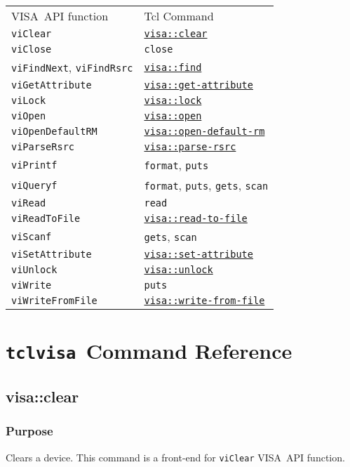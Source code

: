 \documentclass[12pt, a4paper]{report}
\newcommand{\tclvisa}{{\tt tclvisa }}
\newcommand{\VISA}{\mbox{VISA }}
\newcommand{\COMMANDREF}[1]{{\tt \hyperref[#1]{#1}}}
\newcommand{\VISACOMMANDREF}[1]{{\tt \mbox{#1}}\index{#1}}
\newcommand{\TCLCOMMANDREF}[1]{{\tt \mbox{#1}}\index{#1}}
\newcommand{\PURPOSE}{\subsection*{Purpose}}
\newcommand{\COMMAND}[1]{\section{#1}\label{#1}}
\begin{document}
\begin{tabular}{ll}
\VISA API function & Tcl Command \\
\VISACOMMANDREF{viClear} & \COMMANDREF{visa::clear}	\\
\VISACOMMANDREF{viClose} & \TCLCOMMANDREF{close}	\\
\VISACOMMANDREF{viFindNext}, \VISACOMMANDREF{viFindRsrc} & \COMMANDREF{visa::find}	\\
\VISACOMMANDREF{viGetAttribute} & \COMMANDREF{visa::get-attribute}	\\
\VISACOMMANDREF{viLock} & \COMMANDREF{visa::lock}	\\
\VISACOMMANDREF{viOpen} & \COMMANDREF{visa::open}	\\
\VISACOMMANDREF{viOpenDefaultRM} & \COMMANDREF{visa::open-default-rm}	\\
\VISACOMMANDREF{viParseRsrc} & \COMMANDREF{visa::parse-rsrc}	\\
\VISACOMMANDREF{viPrintf} & \TCLCOMMANDREF{format}, \TCLCOMMANDREF{puts}	\\
\VISACOMMANDREF{viQueryf} & \TCLCOMMANDREF{format}, \TCLCOMMANDREF{puts}, \TCLCOMMANDREF{gets}, \TCLCOMMANDREF{scan}	\\
\VISACOMMANDREF{viRead} & \TCLCOMMANDREF{read}	\\
\VISACOMMANDREF{viReadToFile} & \COMMANDREF{visa::read-to-file}	\\
\VISACOMMANDREF{viScanf} & \TCLCOMMANDREF{gets}, \TCLCOMMANDREF{scan}	\\
\VISACOMMANDREF{viSetAttribute} & \COMMANDREF{visa::set-attribute}	\\
\VISACOMMANDREF{viUnlock} & \COMMANDREF{visa::unlock}	\\
\VISACOMMANDREF{viWrite} & \TCLCOMMANDREF{puts}	\\
\VISACOMMANDREF{viWriteFromFile} & \COMMANDREF{visa::write-from-file}	\\
\end{tabular}

\chapter{\tclvisa Command Reference}


\COMMAND{visa::clear}

\PURPOSE

Clears a device. This command is a front-end for \VISACOMMANDREF{viClear} \VISA API function.
\end{document}
